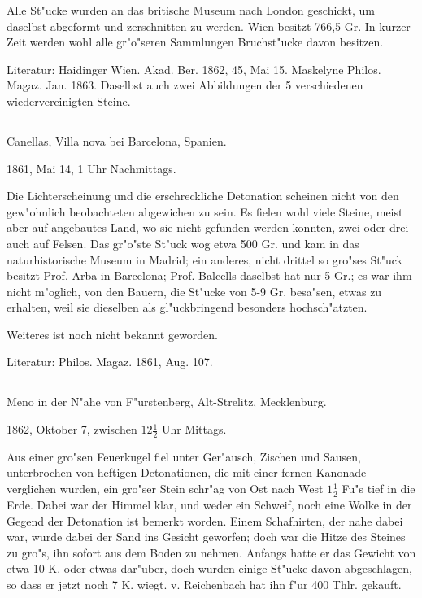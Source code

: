 \documentclass[a4paper, 11pt, oneside]{article}
\begin{document}
Alle St"ucke wurden an das britische Museum nach London geschickt, um daselbst abgeformt und zerschnitten zu werden. Wien besitzt 766,5 Gr. In kurzer Zeit werden wohl alle gr"o"seren Sammlungen Bruchst"ucke davon besitzen.

\normalsize
Literatur: Haidinger Wien. Akad. Ber. 1862, 45, Mai 15. Maskelyne Philos. Magaz. Jan. 1863. Daselbst auch zwei Abbildungen der 5 verschiedenen wiedervereinigten Steine.

\subsection{}
\LARGE
\paragraph{}
Canellas, Villa nova bei Barcelona, Spanien.

1861, Mai 14, 1 Uhr Nachmittags.

Die Lichterscheinung und die erschreckliche Detonation scheinen nicht von den gew"ohnlich beobachteten abgewichen zu sein. Es fielen wohl viele Steine, meist aber auf angebautes Land, wo sie nicht gefunden werden konnten, zwei oder drei auch auf Felsen. Das gr"o"ste St"uck wog etwa 500 Gr. und kam in das naturhistorische Museum in Madrid; ein anderes, nicht drittel so gro"ses St"uck besitzt Prof. Arba in Barcelona; Prof. Balcells daselbst hat nur 5 Gr.; es war ihm nicht m"oglich, von den Bauern, die St"ucke von 5-9 Gr. besa"sen, etwas zu erhalten, weil sie dieselben als gl"uckbringend besonders hochsch"atzten.

Weiteres ist noch nicht bekannt geworden.

\normalsize
Literatur: Philos. Magaz. 1861, Aug. 107.

\subsection{}
\LARGE
\paragraph{}
Meno in der N"ahe von F"urstenberg, Alt-Strelitz, Mecklenburg.

1862, Oktober 7, zwischen $\mathfrak{12\frac{1}{2}}$ Uhr Mittags.

Aus einer gro"sen Feuerkugel fiel unter Ger"ausch, Zischen und Sausen, unterbrochen von heftigen Detonationen, die mit einer fernen Kanonade verglichen wurden, ein gro"ser Stein schr"ag von Ost nach West $\mathfrak{1\frac{1}{2}}$ Fu"s tief in die Erde. Dabei war der Himmel klar, und weder ein Schweif, noch eine Wolke in der Gegend der Detonation ist bemerkt worden. Einem Schafhirten, der nahe dabei war, wurde dabei der Sand ins Gesicht geworfen; doch war die Hitze des Steines zu gro"s, ihn sofort aus dem Boden zu nehmen. Anfangs hatte er das Gewicht von etwa 10 K. oder etwas dar"uber, doch wurden einige St"ucke davon abgeschlagen, so dass er jetzt noch 7 K. wiegt. v. Reichenbach hat ihn f"ur 400 Thlr. gekauft.
\end{document}
